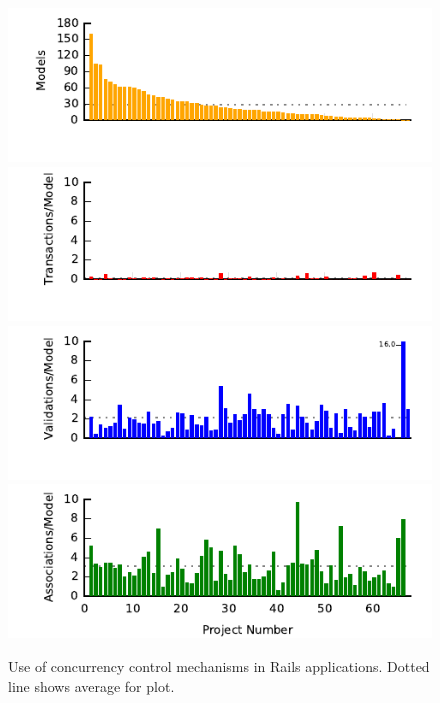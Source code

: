 \begin{figure}
  \newcommand{\skipht}{\\[-2em]}
\includegraphics[width=\columnwidth]{figs/models-single-bar.pdf}\skipht
\includegraphics[width=\columnwidth]{figs/transactions-single-bar.pdf}\skipht
\includegraphics[width=\columnwidth]{figs/validations-single-bar.pdf}\skipht
\includegraphics[width=\columnwidth]{figs/associations-single-bar.pdf}\skipht
\caption{Use of concurrency control mechanisms in Rails
  applications. Dotted line shows average for plot.}
\label{fig:usages}
\end{figure}

